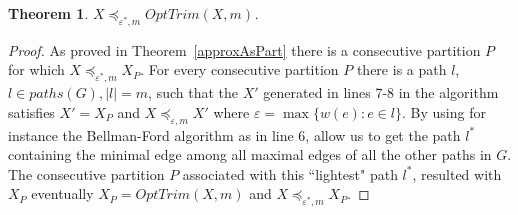 \documentclass[review]{elsarticle}
\newtheorem{theorem}{Theorem}
\DeclareMathOperator{\support}{support}
\begin{document}
\begin{theorem}
$X \preceq_{\varepsilon^*,m} OptTrim(X,m)$.
\end{theorem}

\begin{proof}
As proved in Theorem~\ref{approxAsPart} there is a consecutive partition $P$ for which $X \preceq_{\varepsilon^*,m} X_P$.
For every consecutive partition $P$ there is a path $l$, $l\in paths(G), |l|=m$, such that the $X'$ generated in lines 7-8 in the algorithm satisfies $X' = X_P$ and  $X\preceq_{\varepsilon,m} X'$ where $\varepsilon = \max \{ w(e)\colon e \in l  \}$. By using for instance the Bellman-Ford algorithm as in line 6, allow us to get the path $l^*$ containing the minimal edge among all maximal edges of all the other paths in $G$. The consecutive partition $P$ associated with this ``lightest" path $l^*$, resulted with $X_P$ eventually $X_P = OptTrim(X,m)$ and  $X \preceq_{\varepsilon^*,m} X_P$.
\end{proof}

%
%
\end{document}
